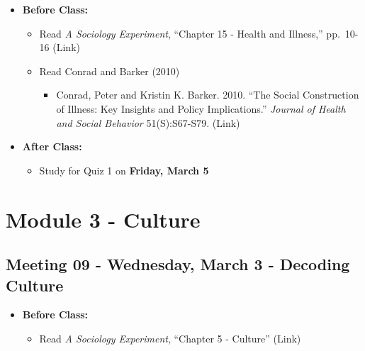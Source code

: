 \documentclass[
]{book}
\providecommand{\tightlist}{%
  \setlength{\itemsep}{0pt}\setlength{\parskip}{0pt}}
\begin{document}
\begin{itemize}
\tightlist
\item
  \textbf{Before Class:}

  \begin{itemize}
  \tightlist
  \item
    Read \emph{A Sociology Experiment}, ``Chapter 15 - Health and Illness,'' pp.~10-16 (Link)
  \item
    Read Conrad and Barker (2010)

    \begin{itemize}
    \tightlist
    \item
      Conrad, Peter and Kristin K. Barker. 2010. ``The Social Construction of Illness: Key Insights and Policy Implications.'' \emph{Journal of Health and Social Behavior} 51(S):S67-S79. (Link)
    \end{itemize}
  \end{itemize}
\item
  \textbf{After Class:}

  \begin{itemize}
  \tightlist
  \item
    Study for Quiz 1 on \textbf{Friday, March 5}
  \end{itemize}
\end{itemize}

\newpage

\hypertarget{module-3---culture}{%
\section{Module 3 - Culture}\label{module-3---culture}}

\hypertarget{meeting-09---wednesday-march-3---decoding-culture}{%
\subsection*{Meeting 09 - Wednesday, March 3 - Decoding Culture}\label{meeting-09---wednesday-march-3---decoding-culture}}

\begin{itemize}
\tightlist
\item
  \textbf{Before Class:}

  \begin{itemize}
  \tightlist
  \item
    Read \emph{A Sociology Experiment}, ``Chapter 5 - Culture'' (Link)
  \end{itemize}
\end{itemize}
\end{document}

